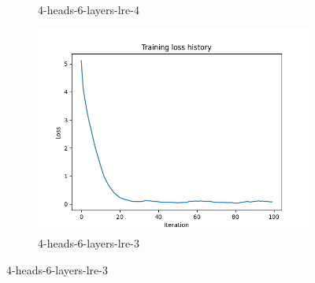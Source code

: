 \documentclass[11pt,addpoints,answers]{exam}
\numberwithin{equation}{section} %
\numberwithin{figure}{section} %
\numberwithin{table}{section} %
\begin{document}
\begin{questions}
\begin{figure}[H]
\begin{subfigure}[b]{0.32\linewidth}
        \caption{4-heads-6-layers-lre-4}
    \end{subfigure}
    \begin{subfigure}[b]{0.32\linewidth}
        \includegraphics[width=\linewidth]{../transformer_captioning/plots 2/case3_loss_out.png}
        \caption{4-heads-6-layers-lre-3}
    \end{subfigure}
    

\end{figure}
\end{questions}
\end{document}
